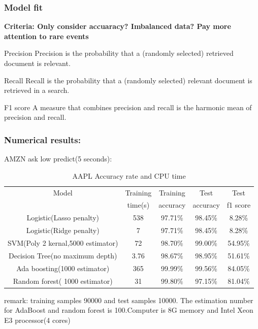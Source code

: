 \documentclass[xcolor={x11names,svgnames,dvipsnames}]{beamer}
\begin{document}
\begin{frame}
\frametitle{Model fit}
\small \textbf{Criteria: Only consider accuaracy? Imbalanced data? Pay more attention to rare events}\\
\begin{block}{Precision}
\scriptsize{Precision is the probability that a (randomly selected) retrieved document is relevant.}\\
\end{block}
\begin{block}{Recall}
\scriptsize{Recall is the probability that a (randomly selected) relevant document is retrieved in a search.}\\
\end{block}
\begin{block}{F1 score}
\scriptsize{A measure that combines precision and recall is the harmonic mean of precision and recall.}\\
\end{block}

\end{frame}


\begin{frame}
\frametitle{Numerical results:}

\begin{block}{AMZN ask low predict(5 seconds):}
\begin{table}[h!]\scriptsize
  \caption{AAPL Accuracy rate and CPU time}
\begin{center}
    \begin{tabular}{| c | c|c|c|c|}
    \hline

Model&	Training &	Training &	Test &	Test\\
&	time(s)&	accuracy&	accuracy&	f1 score\\
    \hline
Logistic(Lasso penalty)&	538&	97.71\%& 	98.45\%& 	8.28\%\\
Logistic(Ridge penalty)	& 7&	97.71\%& 	98.45\%& 	8.28\%\\
SVM(Poly 2 kernal,5000 estimator)&  	72& 	98.70\%& 	99.00\%&	54.95\%\\
Decision Tree(no maximum depth)&	3.76& 	98.67\%& 	98.95\%& 	51.61\% \\
Ada boosting(1000 estimator)&	365& 	99.99\%& 	99.56\%& 	\alert{84.05}\%\\
Random forest( 1000 estimator)&	31& 	99.80\%& 	97.15\%& 	\alert{81.04}\%\\


\hline
\end{tabular}
\end{center}
\end{table}
\end{block}
\small{remark: \alert{training samples 90000 and test samples 10000}. The estimation number for AdaBoost and random forest is 100.Computer is 8G memory and Intel Xeon E3 processor(4 cores)}
\end{frame}​
\end{document}
